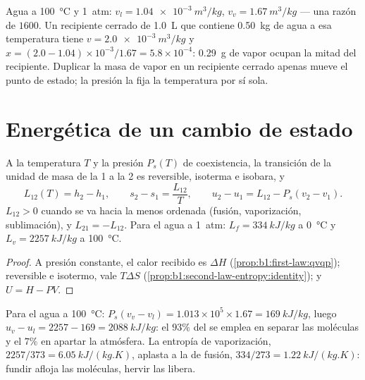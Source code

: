 \begin{example}\label{ex:b1:phase-changes:lever}
Agua a \qty{100}{\degreeCelsius} y \qty{1}{atm}: $v_l = \qty{1.04e-3}{m^3/kg}$,
$v_v = \qty{1.67}{m^3/kg}$ --- una razón de $1600$. Un recipiente cerrado
de \qty{1.0}{L} que contiene \qty{0.50}{kg} de agua a esa temperatura tiene $v =
\qty{2.0e-3}{m^3/kg}$ y $x = (2.0 - 1.04) \times 10^{-3}/1.67 = 5.8 \times 10^{-4}$:
\qty{0.29}{g} de vapor ocupan la mitad del recipiente. Duplicar la masa
de vapor en un recipiente cerrado apenas mueve el punto de estado; la
presión la fija la temperatura por sí sola.
\end{example}

\section{Energética de un cambio de estado}

\begin{proposition}\label{prop:b1:phase-changes:latent}
A la temperatura $T$ y la presión $P_s(T)$ de coexistencia, la transición
de la unidad de masa de la  1 a la  2 es reversible, isoterma e
isobara, y
\[
L_{12}(T) = h_2 - h_1 , \qquad s_2 - s_1 = \frac{L_{12}}{T} , \qquad
u_2 - u_1 = L_{12} - P_s(v_2 - v_1) .
\]
$L_{12} > 0$ cuando se va hacia la  menos ordenada (fusión,
vaporización, sublimación), y $L_{21} = -L_{12}$. Para el agua a \qty{1}{atm}:
$L_f = \qty{334}{kJ/kg}$ a \qty{0}{\degreeCelsius} y $L_v = \qty{2257}{kJ/kg}$ a
\qty{100}{\degreeCelsius}.
\end{proposition}

\begin{proof}
A presión constante, el calor recibido es $\Delta H$
(\cref{prop:b1:first-law:qvqp}); reversible e isotermo, vale
$T\Delta S$ (\cref{prop:b1:second-law-entropy:identity}); y $U = H - PV$.
\end{proof}

\begin{example}\label{ex:b1:phase-changes:whereheat}
Para el agua a \qty{100}{\degreeCelsius}: $P_s(v_v - v_l) = 1.013 \times 10^5 \times
1.67 = \qty{169}{kJ/kg}$, luego $u_v - u_l = 2257 - 169 = \qty{2088}{kJ/kg}$:
el $93\%$ del  se emplea en separar las moléculas y el $7\%$
en apartar la atmósfera. La entropía de vaporización,
$2257/373 = \qty{6.05}{kJ/(kg.K)}$, aplasta a la de fusión, $334/273 =
\qty{1.22}{kJ/(kg.K)}$: fundir afloja las moléculas, hervir las libera.
\end{example}

